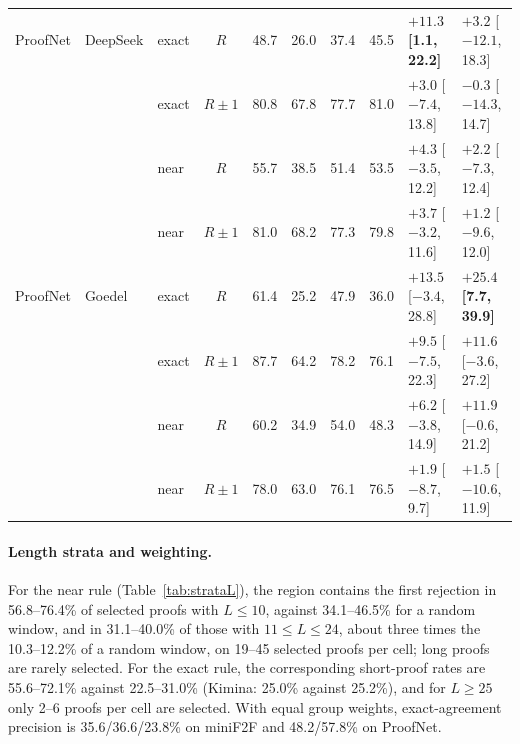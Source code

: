 \begin{table}[h]
\begin{center}
\begin{tabular}{lllcrrrrll}
ProofNet & DeepSeek & exact & $R$ & 48.7 & 26.0 & 37.4 & 45.5 & $\mathbf{+11.3}$ \textbf{[1.1, 22.2]} & $+3.2$ [$-12.1$, 18.3]\\
 & & exact & $R\pm1$ & 80.8 & 67.8 & 77.7 & 81.0 & $+3.0$ [$-7.4$, 13.8] & $-0.3$ [$-14.3$, 14.7]\\
 & & near & $R$ & 55.7 & 38.5 & 51.4 & 53.5 & $+4.3$ [$-3.5$, 12.2] & $+2.2$ [$-7.3$, 12.4]\\
 & & near & $R\pm1$ & 81.0 & 68.2 & 77.3 & 79.8 & $+3.7$ [$-3.2$, 11.6] & $+1.2$ [$-9.6$, 12.0]\\
ProofNet & Goedel & exact & $R$ & 61.4 & 25.2 & 47.9 & 36.0 & $+13.5$ [$-3.4$, 28.8] & $\mathbf{+25.4}$ \textbf{[7.7, 39.9]}\\
 & & exact & $R\pm1$ & 87.7 & 64.2 & 78.2 & 76.1 & $+9.5$ [$-7.5$, 22.3] & $+11.6$ [$-3.6$, 27.2]\\
 & & near & $R$ & 60.2 & 34.9 & 54.0 & 48.3 & $+6.2$ [$-3.8$, 14.9] & $+11.9$ [$-0.6$, 21.2]\\
 & & near & $R\pm1$ & 78.0 & 63.0 & 76.1 & 76.5 & $+1.9$ [$-8.7$, 9.7] & $+1.5$ [$-10.6$, 11.9]\\
\bottomrule
\end{tabular}
\end{center}
\end{table}

\paragraph{Length strata and weighting.} For the near rule (Table~\ref{tab:strataL}), the region contains the first rejection in 56.8--76.4\% of selected proofs with $L\le10$, against 34.1--46.5\% for a random window, and in 31.1--40.0\% of those with $11\le L\le24$, about three times the 10.3--12.2\% of a random window, on 19--45 selected proofs per cell; long proofs are rarely selected. For the exact rule, the corresponding short-proof rates are 55.6--72.1\% against 22.5--31.0\% (Kimina: 25.0\% against 25.2\%), and for $L\ge25$ only 2--6 proofs per cell are selected. With equal group weights, exact-agreement precision is 35.6/36.6/23.8\% on miniF2F and 48.2/57.8\% on ProofNet.

